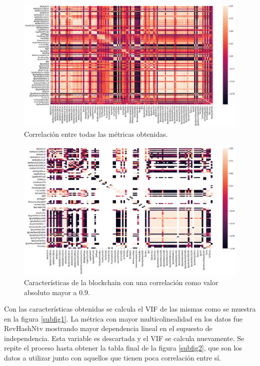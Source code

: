 \begin{figure}[!h]
	\centering
	\includegraphics[scale=0.4]{Chapter5/corr_map.png}
	\caption{Correlación entre todas las métricas obtenidas.}
	\label{fig6}
\end{figure}

\begin{figure}[!h]
	\centering
	\includegraphics[scale=0.4]{Chapter5/corr_map2.png}
	\caption{Características de la blockchain con una correlación como valor absoluto mayor a 0.9.}
	\label{fig7}
\end{figure}

Con las características obtenidas se calcula el VIF de las mismas como se muestra en la figura \cref{subfig1}. La métrica con mayor multicolinealidad en los datos fue RevHashNtv mostrando mayor dependencia lineal en el supuesto de independencia. Esta variable es descartada y el VIF se calcula nuevamente. Se repite el proceso hasta obtener la tabla final de la figura \cref{subfig2}, que son los datos a utilizar junto con aquellos que tienen poca correlación entre sí.

